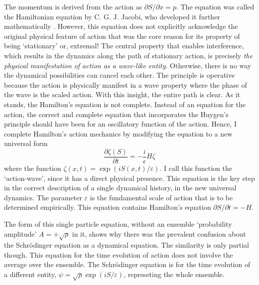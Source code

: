 The momentum is derived from the action as $\partial S/ \partial x = p$. The equation was called the
Hamiltonian equation by C. G. J. Jacobi, who developed it further mathematically \cite{chap14-key7}.
However, this equation does not explicitly acknowledge the original physical feature of action
that was the core reason for its property of being `stationary' or, extremal! The central
property that enables interference, which results in the dynamics along the path of stationary
action, is precisely \textit{the physical manifestation of action as a wave-like entity}. Otherwise, there
is no way the dynamical possibilities can cancel each other. The principle is operative because
the action is physically manifest in a wave property where the phase of the wave is the scaled
action. With this insight, the entire path is clear. As it stands, the Hamilton's equation
is not complete. Instead of an equation for the action, the correct and complete equation
that incorporates the Huygen's principle should have been for an oscillatory function of the
action. Hence, I complete Hamilton's action mechanics by modifying the equation to a new
universal form \cite{chap14-key2}
\begin{equation*}
\frac{\partial \zeta(S)}{\partial t} = - \frac{i}{\epsilon} H \zeta \tag{23}\label{c14-eq23}
\end{equation*}
where the function $\zeta(x, t) = \exp(iS(x, t)/\varepsilon)$. I call this function the `action-wave', since it
has a direct physical presence. This equation is the key step in the correct description of a
single dynamical history, in the new universal dynamics. The
parameter $\varepsilon$ is the fundamental scale of action that is to be determined empirically. This
equation contains Hamilton's equation $\partial S/\partial t = -H$.

The form of this single particle equation, without an ensemble `probability amplitude'
$A = + \sqrt{\rho}$ in it, shows why there was the prevalent confusion about the Schr\"{o}dinger equation
as a dynamical equation. The similarity is only partial though. This equation for the
time evolution of action does not involve the average over the ensemble. The Schr\"{o}dinger
equation is for the time evolution of a different entity, $\psi = \sqrt{\rho} \exp(iS/\varepsilon)$, represeting the
whole ensemble.

